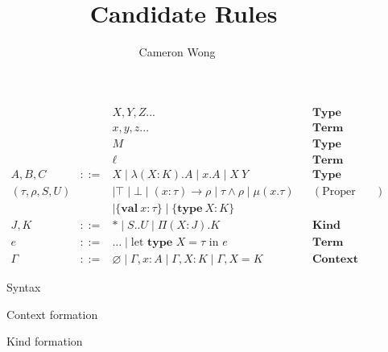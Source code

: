 \documentclass[a4paper, 10pt]{article}
\title{\DOTw\ Candidate Rules}
\author{Cameron Wong}
\newcommand{\interval}[2]{#1 .. #2}
\newcommand{\isctx}[1]{#1\ \texttt{ctx}}
\newcommand{\iskd}[1]{#1\ \texttt{kd}}
\newcommand{\TyKd}{*}
\newcommand{\KDepArr}[3]{\Pi(#1:#2).#3}
\newcommand{\TDepArr}[3]{(#1:#2) \rightarrow #3}
\newcommand{\objtyp}[3]{\{ \textbf{#1}\ #2 : #3 \}}
\begin{document}
\maketitle

\begin{figure}[h]
  \begin{align*}
          && X,Y,Z... && \textbf{Type Variable} \\
          && x,y,z... && \textbf{Term Variable} \\
          && M && \textbf{Type Label} \\
          && \ell && \textbf{Term Label} \\
    A,B,C &::=& X \mid \lambda(X:K).A \mid x.A \mid X\ Y
      && \textbf{Type} \\
    (\tau, \rho, S, U) &&\mid
      \top \mid \bot \mid \TDepArr{x}{\tau}{\rho} \mid \tau \land \rho
      \mid \mu(x . \tau)
      && (\text{Proper types})\\
    &&\mid \objtyp{val}{x}{\tau} \mid \objtyp{type}{X}{K} \\
    J,K &::=& \TyKd \mid \interval{S}{U} \mid \KDepArr{X}{J}{K}
      && \textbf{Kind} \\
    e &::=& \dots \mid \text{let }\textbf{type }X = \tau\text{ in }e
      && \textbf{Term} \\
    \Gamma &::=& \varnothing \mid \Gamma, x:A \mid \Gamma, X:K \mid \Gamma, X=K
      && \textbf{Context}
  \end{align*}
  \caption{Syntax}
\end{figure}

\begin{figure}[ht]
  \caption{Context formation}
\end{figure}

\begin{figure}[ht]
  \caption{Kind formation}
\end{figure}
\end{document}
